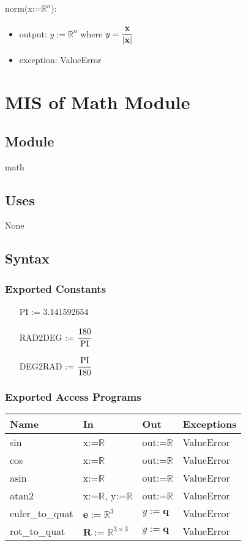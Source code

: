 \documentclass[12pt, titlepage]{article}
\begin{document}
\noindent norm(x:=$\mathbb{R}^{n}$):
\begin{itemize}
\item output: $y:=\mathbb{R}^{n}$ where $y = \cfrac{\mathbf{x}}{|\mathbf{x}|}$
\item exception: ValueError
\end{itemize}

\newpage

\section{MIS of Math Module} \label{mm}

\subsection{Module}
math

\subsection{Uses}
None

\subsection{Syntax}

\subsubsection{Exported Constants}
\begin{itemize}
  \item[PI] := 3.141592654
  \item[RAD2DEG] := $\cfrac{180}{\text{PI}}$
  \item[DEG2RAD] := $\cfrac{\text{PI}}{180}$
\end{itemize}


\subsubsection{Exported Access Programs}

\begin{center}
\begin{tabular}{p{2cm} p{4cm} p{4cm} p{2cm}}
\hline
\textbf{Name} & \textbf{In} & \textbf{Out} & \textbf{Exceptions} \\
\hline
sin & x:=$\mathbb{R}$ & out:=$\mathbb{R}$ & ValueError \\
cos & x:=$\mathbb{R}$ & out:=$\mathbb{R}$ & ValueError \\
asin & x:=$\mathbb{R}$ & out:=$\mathbb{R}$ & ValueError \\
atan2 & x:=$\mathbb{R}$, y:=$\mathbb{R}$ & out:=$\mathbb{R}$ & ValueError \\
euler\_to\_quat & $\mathbf{e}:=\mathbb{R}^3$& $y:=\mathbf{q}$ & ValueError \\
rot\_to\_quat & $\mathbf{R} := \mathbb{R}^{3 \times 3}$ & $y:=\mathbf{q}$ & ValueError \\
\hline
\end{tabular}
\end{center}
\end{document}
